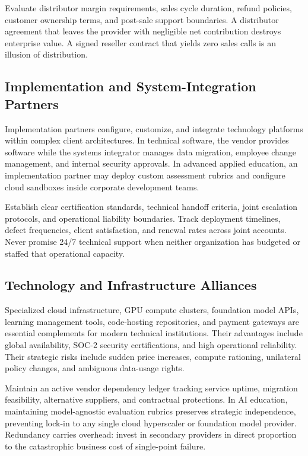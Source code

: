 Evaluate distributor margin requirements, sales cycle duration, refund policies, customer ownership terms, and post-sale support boundaries. A distributor agreement that leaves the provider with negligible net contribution destroys enterprise value. A signed reseller contract that yields zero sales calls is an illusion of distribution.

\subsection{Implementation and System-Integration Partners}
\label{sec:system_integration_partners}

Implementation partners configure, customize, and integrate technology platforms within complex client architectures. In technical software, the vendor provides software while the systems integrator manages data migration, employee change management, and internal security approvals. In advanced applied education, an implementation partner may deploy custom assessment rubrics and configure cloud sandboxes inside corporate development teams.

Establish clear certification standards, technical handoff criteria, joint escalation protocols, and operational liability boundaries. Track deployment timelines, defect frequencies, client satisfaction, and renewal rates across joint accounts. Never promise 24/7 technical support when neither organization has budgeted or staffed that operational capacity.

\subsection{Technology and Infrastructure Alliances}
\label{sec:technology_infrastructure_alliances}

Specialized cloud infrastructure, GPU compute clusters, foundation model APIs, learning management tools, code-hosting repositories, and payment gateways are essential complements for modern technical institutions. Their advantages include global availability, SOC-2 security certifications, and high operational reliability. Their strategic risks include sudden price increases, compute rationing, unilateral policy changes, and ambiguous data-usage rights.

Maintain an active vendor dependency ledger tracking service uptime, migration feasibility, alternative suppliers, and contractual protections. In AI education, maintaining model-agnostic evaluation rubrics preserves strategic independence, preventing lock-in to any single cloud hyperscaler or foundation model provider. Redundancy carries overhead: invest in secondary providers in direct proportion to the catastrophic business cost of single-point failure.

